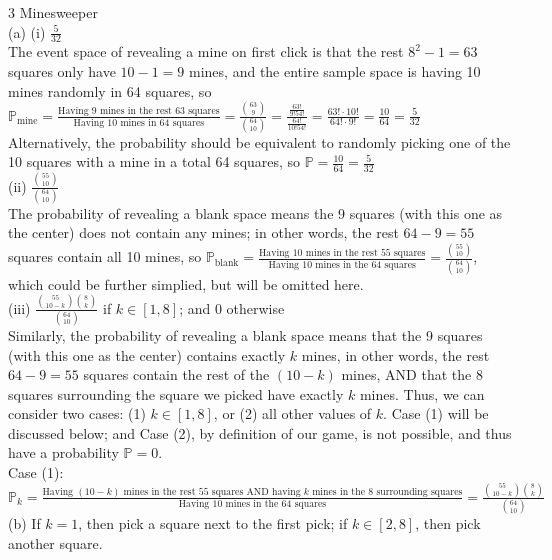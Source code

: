 \documentclass{article}
\begin{document}
{\Large 3 Minesweeper} \\[.5cm]
{\color{red} (a) (i) $\frac{5}{32}$} \\

The event space of revealing a mine on first click is that the rest $8^2-1 = 63$ squares only have $10-1=9$ mines, and the entire sample space is having 10 mines randomly in 64 squares, so$\mathbb{P}_\text{{mine}} = \frac{\text{Having 9 mines in the rest 63 squares}}{\text{Having 10 mines in 64 squares}}
= \frac{\binom{63}{9}}{\binom{64}{10}} = \frac{\frac{63!}{9!54!}}{\frac{64!}{10!54!}}
= \frac{63!\cdot10!}{64!\cdot9!} = \frac{10}{64} = \frac{5}{32}$ \\

Alternatively, the probability should be equivalent to randomly picking one of the 10 squares with a mine in a total 64 squares, so $\mathbb{P} = \frac{10}{64} = \frac{5}{32}$ \\

{\color{red} (ii) $\frac{\binom{55}{10}}{\binom{64}{10}}$ } \\

The probability of revealing a blank space means the 9 squares (with this one as the center) does not contain any mines; in other words, the rest $64-9=55$ squares contain all 10 mines, so
$\mathbb{P}_\text{{blank}} = \frac{\text{Having 10 mines in the rest 55 squares}}{\text{Having 10 mines in the 64 squares}}
= \frac{\binom{55}{10}}{\binom{64}{10}}$, which could be further simplied, but will be omitted here. \\

{\color{red} (iii) $\frac{\binom{55}{10-k}\binom{8}{k}}{\binom{64}{10}}$ if $k\in[1, 8]$; and 0 otherwise} \\

Similarly, the probability of revealing a blank space means that the 9 squares (with this one as the center) contains exactly $k$ mines, in other words, the rest $64-9=55$ squares contain the rest of the $(10-k)$ mines, AND that the 8 squares surrounding the square we picked have exactly $k$ mines. Thus, we can consider two cases: (1) $k\in[1, 8]$, or (2) all other values of $k$. Case (1) will be discussed below; and Case (2), by definition of our game, is not possible, and thus have a probability $\mathbb{P} = 0$. \\

Case (1): \\

$\mathbb{P}_k = \frac{\text{Having } (10-k) \text{ mines in the rest 55 squares AND having } k \text{ mines in the 8 surrounding squares}}{\text{Having 10 mines in the 64 squares}} = \frac{\binom{55}{10-k}\binom{8}{k}}{\binom{64}{10}}$ \\[.5cm]
{\color{red} (b) If $k=1$, then pick a square next to the first pick; if $k\in[2,8]$, then pick another square.} \\
\end{document}
